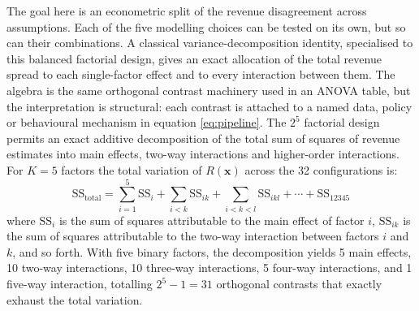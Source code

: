 \documentclass[11pt,a4paper]{article}
\begin{document}
The goal here is an econometric split of the revenue disagreement across assumptions. Each of the five modelling choices can be tested on its own, but so can their combinations. A classical variance-decomposition identity, specialised to this balanced factorial design, gives an exact allocation of the total revenue spread to each single-factor effect and to every interaction between them. The algebra is the same orthogonal contrast machinery used in an ANOVA table, but the interpretation is structural: each contrast is attached to a named data, policy or behavioural mechanism in equation \eqref{eq:pipeline}. The $2^5$ factorial design permits an exact additive decomposition of the total sum of squares of revenue estimates into main effects, two-way interactions and higher-order interactions. For $K = 5$ factors the total variation of $R(\mathbf{x})$ across the 32 configurations is:
\begin{equation}\label{eq:anova}
\text{SS}_{\text{total}} = \sum_{i=1}^{5} \text{SS}_i + \sum_{i<k} \text{SS}_{ik} + \sum_{i<k<l} \text{SS}_{ikl} + \cdots + \text{SS}_{12345}
\end{equation}
where $\text{SS}_i$ is the sum of squares attributable to the main effect of factor $i$, $\text{SS}_{ik}$ is the sum of squares attributable to the two-way interaction between factors $i$ and $k$, and so forth. With five binary factors, the decomposition yields 5 main effects, 10 two-way interactions, 10 three-way interactions, 5 four-way interactions, and 1 five-way interaction, totalling $2^5 - 1 = 31$ orthogonal contrasts that exactly exhaust the total variation.
\end{document}
